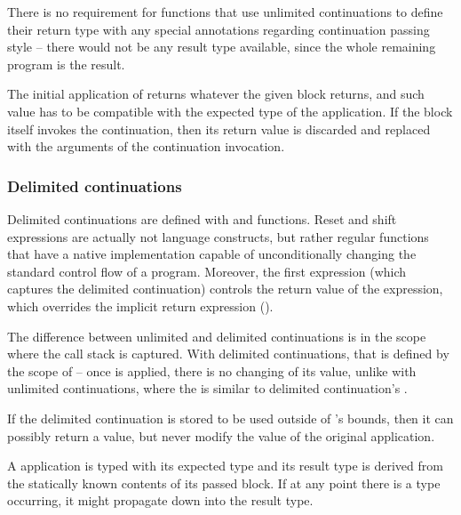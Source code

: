 There is no requirement for functions that use unlimited continuations to define their return type with any special annotations regarding continuation passing style -- there would not be any result type available, since the whole remaining program is the result. 

The initial application of  returns whatever the given block returns, and such value has to be compatible with the expected type of the  application. If the block itself invokes the continuation, then its return value is discarded and replaced with the arguments of the continuation invocation. 







\subsubsection{Delimited continuations}
Delimited continuations are defined with  and  functions. Reset and shift expressions are actually not language constructs, but rather regular functions that have a native implementation capable of unconditionally changing the standard control flow of a program. Moreover, the first  expression (which captures the delimited continuation) controls the return value of the  expression, which overrides the implicit return expression ().

The difference between unlimited and delimited continuations is in the scope where the call stack is captured. With delimited continuations, that is defined by the scope of  -- once  is applied, there is no changing of its value, unlike with unlimited continuations, where the  is similar to delimited continuation's . 

If the delimited continuation is stored to be used outside of 's bounds, then it can possibly return a value, but never modify the value of the original  application.

A  application is typed with its expected type and its result type is derived from the statically known contents of its passed block. If at any point there is a  type occurring, it might propagate down into the result type. 

